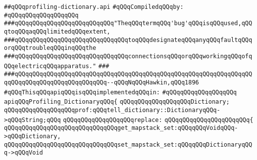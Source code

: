 \label{src/lib/compiler/debugging-and-profiling/profiling/profiling-dictionary.api}
\verb|##qQQqprofiling-dictionary.api|\newline
\newline
\verb|#qQQqCompiledqQQqby:|\newline
\verb|#qQQqqQQqqQQqqQQqqQQq|\newline
\newline
\newline
\verb|###qQQqqQQqqQQqqQQqqQQqqQQqqQQq"TheqQQqtermqQQq'bug'qQQqisqQQqused,qQQqtoqQQqaqQQqlimitedqQQqextent,|\newline
\verb|###qQQqqQQqqQQqqQQqqQQqqQQqqQQqqQQqtoqQQqdesignateqQQqanyqQQqfaultqQQqorqQQqtroubleqQQqinqQQqthe|\newline
\verb|###qQQqqQQqqQQqqQQqqQQqqQQqqQQqqQQqconnectionsqQQqorqQQqworkingqQQqofqQQqelectricqQQqapparatus."|\newline
\verb|###|\newline
\verb|###qQQqqQQqqQQqqQQqqQQqqQQqqQQqqQQqqQQqqQQqqQQqqQQqqQQqqQQqqQQqqQQqqQQqqQQqqQQqqQQqqQQqqQQqqQQqqQQq--qQQqNqQQqHawkin,qQQq1896|\newline
\newline
\newline
\verb|#qQQqThisqQQqapiqQQqisqQQqimplementedqQQqin:|\newline
\verb|#qQQqqQQqqQQqqQQqqQQq|\newline
\newline
\verb|apiqQQqProfiling_DictionaryqQQq{|\newline
\newline
\verb|qQQqqQQqqQQqqQQqqQQqDictionary;|\newline
\verb|qQQqqQQqqQQqqQQqqQQqprof:qQQqtell_dictionary::DictionaryqQQq->qQQqString;qQQq|\newline
\newline
\verb|qQQqqQQqqQQqqQQqqQQqreplace:|\newline
\verb|qQQqqQQqqQQqqQQqqQQqqQQq{|\newline
\verb|qQQqqQQqqQQqqQQqqQQqqQQqqQQqqQQqget_mapstack_set:qQQqqQQqVoidqQQq->qQQqDictionary,|\newline
\verb|qQQqqQQqqQQqqQQqqQQqqQQqqQQqqQQqset_mapstack_set:qQQqqQQqDictionaryqQQq->qQQqVoid|\newline
